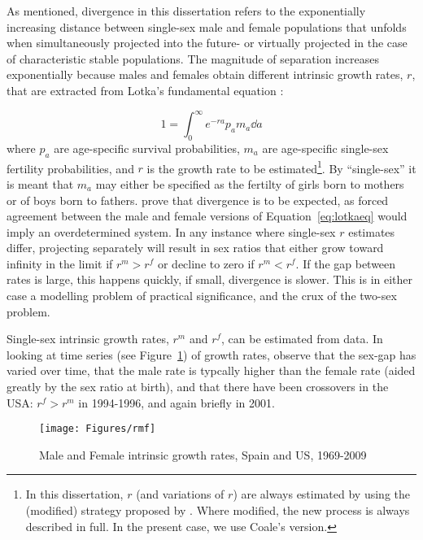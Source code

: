  \FloatBarrier
 \label{sex:divlotkar}
As mentioned, divergence in this dissertation refers to the exponentially
increasing distance between single-sex male and female populations that unfolds
when simultaneously projected into the future- or virtually projected in the
case of characteristic stable populations. The magnitude of separation increases
exponentially because males and females obtain different intrinsic 
growth rates, $r$, that are extracted from Lotka's fundamental equation
\citep{sharpe1911problem}:

\begin{equation}
\label{eq:lotkaeq}
1 = \int _0 ^\infty e^{-ra}p_a m_a \dd a 
\end{equation}
where $p_a$ are age-specific survival probabilities, $m_a$ are age-specific
single-sex fertility probabilities, and $r$ is the growth rate to be
estimated\footnote{In this dissertation, $r$ (and variations of $r$) are always
estimated by using the (modified) strategy proposed by \citet{coale1957new}.
Where modified, the new process is always described in full. In the present
case, we use Coale's version.}. By ``single-sex'' it is meant that $m_a$ may
either be specified as the fertilty of girls born to mothers or of boys born to fathers. \citet{yellin1977comparison} prove that divergence is to be expected, as forced agreement between the male and female versions of Equation~\eqref{eq:lotkaeq} would imply an overdetermined system. 
In any instance
where single-sex $r$ estimates differ, projecting separately will result in sex
ratios that either grow toward infinity in the limit if $r^m
> r^f$ or decline to zero if $r^m < r^f$. If the gap between rates is large, this happens
quickly, if small, divergence is slower. This is in either case a modelling
problem of practical significance, and the crux of the two-sex problem. 

Single-sex intrinsic growth rates, $r^m$ and $r^f$, can be 
estimated from data. In looking at time series (see Figure~\ref{fig:rmf}) of 
 growth rates, observe that the sex-gap has varied over 
time, that the male rate is typcally higher than the female rate (aided greatly 
by the sex ratio at birth), and that there have been crossovers in the USA: 
$r^f > r^m$ in 1994-1996, and again briefly in 2001. 

\begin{figure}[ht!]
        \centering  
          \caption{Male and Female intrinsic growth rates, Spain and US,
          1969-2009}
           \texttt{[image: Figures/rmf]}
          \label{fig:rmf}
\end{figure}

